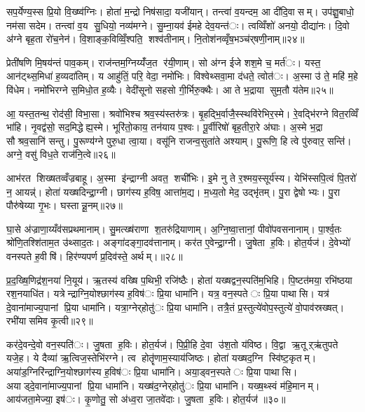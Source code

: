 सप॒र्येण्य॒स्स प्रि॒यो वि॒ख्ष्व॑ग्निः। होता॑ म॒न्द्रो निष॑सादा॒ यजी॑यान्। तन्त्वा॑ व॒यन्दम॒ आ दी॑दि॒वासम्। उप॑ज्ञु॒बाधो॒ नम॑सा सदेम। तन्त्वा॑ व॒य सु॒धियो॒ नव्य॑मग्ने। सु॒म्ना॒यव॑ ईमहे देव॒यन्त॑ः। त्वव्विँशो॑ अनयो॒ दीद्या॑नः। दि॒वो अ॑ग्ने बृह॒ता रो॑च॒नेन॑। वि॒शाङ्क॒विव्विँ॒श्पति॒ शश्व॑तीनाम्। नि॒तोश॑नव्वृँष॒भञ्च॑र्‌षणी॒नाम्॥२४॥

प्रेती॑षणि मि॒षय॑न्तं पाव॒कम्। राज॑न्तम॒ग्निय्यँ॑ज॒त र॑यी॒णाम्। सो अ॑ग्न ईजे शश॒मे च॒ मर्त॑ः। यस्त॒ आन॑ट्थ्स॒मिधा॑ ह॒व्यदा॑तिम्। य आहु॑तिं॒ परि॒ वेदा॒ नमो॑भिः। विश्वेथ्सवा॒मा द॑धते॒ त्वोत॑ः। अ॒स्मा उ॑ ते॒ महि॑ म॒हे वि॑धेम। नमो॑भिरग्ने स॒मिधो॒त ह॒व्यैः। वेदी॑सूनो सहसो गी॒र्भिरु॒क्थैः। आ ते भ॒द्राया सुम॒तौ य॑तेम॥२५॥

आ॒ यस्त॒तन्थ॒ रोद॑सी॒ विभा॒सा। श्रवो॑भिश्च श्रव॒स्य॑स्तरु॑त्रः। बृ॒हद्भि॒र्वाजै॒स्स्थवि॑रेभिर॒स्मे। रे॒वद्भि॑रग्ने वित॒रव्विँ भा॑हि। नृ॒वद्व॑सो॒ सद॒मिद्धेह्य॒स्मे। भूरि॑तो॒काय॒ तन॑याय प॒श्वः। पू॒र्वीरिषो॑ बृह॒तीरा॒रे अ॑घाः। अ॒स्मे भ॒द्रा सौश्रव॒सानि॑ सन्तु। पु॒रूण्य॑ग्ने पुरु॒धा त्वा॒या। वसू॑नि राजन्व॒सुता॑ते अश्याम्। पु॒रूणि॒ हि त्वे पु॑रुवार॒ सन्ति॑। अग्ने॒ वसु॑ विध॒ते राज॑नि॒त्वे॥२६॥


आभ॑रत शिख्षतव्वँज्रबाहू। अ॒स्मा इ॑न्द्राग्नी अवत॒ शची॑भिः। इ॒मे नु ते र॒श्मय॒स्सूर्य॑स्य। येभि॑स्सपि॒त्वं पि॒तरो॑ न॒ आयन्न्॑। होता॑ यख्षदिन्द्रा॒ग्नी। छाग॑स्य ह॒विष॒ आत्ता॑म॒द्य। म॒ध्य॒तो मेद॒ उद्भृ॑तम्। पु॒रा द्वेषोभ्यः। पु॒रा पौरु॑षेय्या गृ॒भः। घस्तान्नू॒नम्॥२७॥

घा॒से अ॑ज्राणा॒य्यँव॑सप्रथमानाम्। सु॒मत्ख्ष॑राणा श॒तरु॑द्रियाणाम्। अ॒ग्नि॒ष्वा॒त्तानां॒ पीवो॑पवसनानाम्। पा॒र्श्व॒तः श्रो॑णि॒तश्शि॑ताम॒त उ॑थ्साद॒तः। अङ्गा॑दङ्गा॒दव॑त्तानाम्। कर॑त ए॒वेन्द्रा॒ग्नी। जु॒षेता ह॒विः। होत॒र्यज॑। दे॒वेभ्यो॑ वनस्पते ह॒वीषि॑। हिर॑ण्यपर्ण प्र॒दिव॑स्ते॒ अर्थम्।॥२८॥

प्र॒द॒ख्षि॒णिद्र॑श॒नया॑ नि॒यूय॑। ऋ॒तस्य॑ वख्षि प॒थिभी॒ रजि॑ष्ठैः। होता॑ यख्षद्वन॒स्पति॑म॒भिहि। पि॒ष्टत॑मया॒ रभि॑ष्ठया रश॒नयाधि॑त। यत्रेन्द्राग्नि॒योश्छाग॑स्य ह॒विष॑ः प्रि॒या धामा॑नि। यत्र॒ वन॒स्पतेः प्रि॒या पाथासि। यत्र॑ दे॒वाना॑माज्य॒पानां प्रि॒या धामा॑नि। यत्रा॒ग्नेर्‌होतु॑ः प्रि॒या धामा॑नि। तत्रै॒तं प्र॒स्तुत्ये॑वोप॒स्तुत्ये॑ वो॒पाव॑स्रख्षत्। रभी॑यासमिव कृ॒त्वी॥२९॥

कर॑दे॒वन्दे॒वो वन॒स्पति॑ः। जु॒षता ह॒विः। होत॒र्यज॑। पि॒प्री॒हि दे॒वा उ॑श॒तो य॑विष्ठ। वि॒द्वा ऋ॒तूऱ्ऋ॑तुपते यजे॒ह। ये दैव्या॑ ऋ॒त्विज॒स्तेभि॑रग्ने। त्व होतॄ॑णाम॒स्याय॑जिष्ठः। होता॑ यख्षद॒ग्नि स्वि॑ष्ट॒कृतम्। अया॑ड॒ग्निरि॑न्द्राग्नि॒योश्छाग॑स्य ह॒विष॑ः प्रि॒या धामा॑नि। अया॒ड्वन॒स्पतेः प्रि॒या पाथासि। अयाड्दे॒वाना॑माज्य॒पानां प्रि॒या धामा॑नि। यख्ष॑द॒ग्नेर्‌होतु॑ः प्रि॒या धामा॑नि। यख्ष॒थ्स्वं म॑हि॒मानम्। आय॑जता॒मेज्या॒ इष॑ः। कृ॒णोतु॒ सो अ॑ध्व॒रा जा॒तवे॑दाः। जु॒षता ह॒विः। होत॒र्यज॑ ॥३०॥

